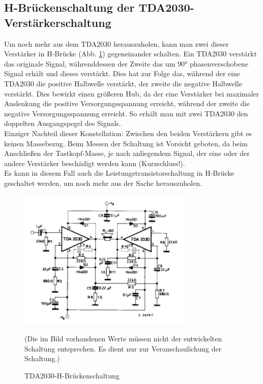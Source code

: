 \newpage
\subsection{H-Brückenschaltung der TDA2030-Verstärkerschaltung}\label{subsec:8.3.4}
Um noch mehr aus dem TDA2030 herauszuholen, kann man zwei dieser Verstärker in H-Brücke (Abb. \ref{fig:8.3.4.1}) gegeneinander schalten.
Ein TDA2030 verstärkt das originale Signal, währenddessen der Zweite das um 90° phasenverschobene Signal erhält und dieses verstärkt.
Dies hat zur Folge das, während der eine TDA2030 die positive Halbwelle verstärkt, der zweite die negative Halbwelle verstärkt.
Dies bewirkt einen größeren Hub, da der eine Verstärker bei maximaler Auslenkung die positive Versorgungsspannung erreicht, während der zweite die negative Versorgungsspannung erreicht.
So erhält man mit zwei TDA2030 den doppelten Ausgangspegel des Signals.\\
Einziger Nachteil dieser Konstellation: Zwischen den beiden Verstärkern gibt es keinen Massebezug.
Beim Messen der Schaltung ist Vorsicht geboten, da beim Anschließen der Tastkopf-Masse, je nach anliegendem Signal, der eine oder der andere Verstärker beschädigt werden kann (Kurzschluss!).\\
Es kann in diesem Fall auch die Leistungstransistorschaltung in H-Brücke geschaltet werden, um noch mehr aus der Sache herauszuholen.
\begin{figure} [H]
	\centering
	\includegraphics[width=0.75\textwidth]{img/Grundlagen/TDA2030/TDA2030-H-Bruecke.PNG}
	\caption[TDA2030-H-Brückenschaltung]{TDA2030-H-Brückenschaltung\footnotemark}
	\text (Die im Bild vorhandenen Werte müssen nicht der entwickelten Schaltung entsprechen. Es dient nur zur Veranschaulichung der Schaltung.)
	\label {fig:8.3.4.1}
\end{figure}


